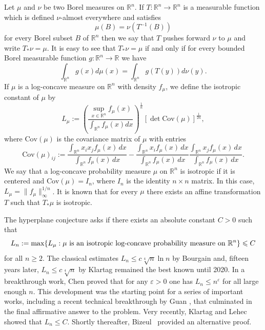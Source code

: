 \documentclass[11pt,leqno]{article}
\theoremstyle{definition}
\theoremstyle{remark}
\numberwithin{equation}{section}
\newcommand{\ls}{\leqslant}
\newcommand{\gr}{\geqslant}
\renewcommand{\epsilon}{\varepsilon}
\newcommand{\1}{\textbf{1}}
\begin{document}
Let $\mu $ and $\nu$ be two Borel measures on ${\mathbb R}^n$. If $T:{\mathbb
R}^n\to {\mathbb R}^n$ is a measurable function which is defined
$\nu $-almost everywhere and satisfies
\begin{equation*}\mu (B)=\nu (T^{-1}(B))\end{equation*}
for every Borel subset $B$ of ${\mathbb R}^n$ then we say that $T$
pushes forward $\nu $ to $\mu $ and write $T_*\nu=\mu$. It is
easy to see that $T_*\nu =\mu $ if and only if for every bounded Borel
measurable function $g:{\mathbb R}^n\to {\mathbb R}$ we have
\begin{equation*}\int_{{\mathbb R}^n}g(x)d\mu (x)=\int_{{\mathbb R}^n}g(T(y))d\nu (y).\end{equation*}
If $\mu $ is a log-concave measure on ${\mathbb R}^n$ with density $f_{\mu}$, we define the isotropic constant of $\mu $ by
\begin{equation*}
L_{\mu }:=\left (\frac{\sup_{x\in {\mathbb R}^n} f_{\mu} (x)}{\int_{{\mathbb
R}^n}f_{\mu}(x)dx}\right )^{\frac{1}{n}} [\det \textrm{Cov}(\mu)]^{\frac{1}{2n}},\end{equation*}
where $\textrm{Cov}(\mu)$ is the covariance matrix of $\mu$ with entries
\begin{equation*}\textrm{Cov}(\mu )_{ij}:=\frac{\int_{{\mathbb R}^n}x_ix_j f_{\mu}
(x)\,dx}{\int_{{\mathbb R}^n} f_{\mu} (x)\,dx}-\frac{\int_{{\mathbb
R}^n}x_i f_{\mu} (x)\,dx}{\int_{{\mathbb R}^n} f_{\mu}
(x)\,dx}\frac{\int_{{\mathbb R}^n}x_j f_{\mu}
(x)\,dx}{\int_{{\mathbb R}^n} f_{\mu} (x)\,dx}.\end{equation*} We say
that a log-concave probability measure $\mu $ on ${\mathbb R}^n$
is isotropic if it is centered and $\textrm{Cov}(\mu )=I_n$,
where $I_n$ is the identity $n\times n$ matrix. In this case, $L_{\mu }=\|f_{\mu }\|_{\infty }^{1/n}$.
It is known that for every $\mu $ there exists an affine transformation $T$
such that $T_{\ast }\mu $ is isotropic. 

The hyperplane conjecture asks if there exists an absolute constant $C>0$ such that
\begin{equation*}L_n:= \max\{ L_{\mu }:\mu\ \hbox{is an isotropic log-concave probability measure on}\ {\mathbb R}^n\}\ls C\end{equation*}
for all $n\gr 2$. The classical estimates $L_n\ls c\sqrt[4]{n}\ln n$ by Bourgain \cite{Bourgain-1991}
and, fifteen years later, $L_n\ls c\sqrt[4]{n}$ by Klartag \cite{Klartag-2006} remained the best known until
2020. In a breakthrough work, Chen \cite{Chen-2021} 
proved that for any $\epsilon >0$
one has $L_n\ls n^{\epsilon}$ for all large enough $n$. This development was the starting point for
a series of important works, including a recent technical breakthrough by Guan \cite{Guan}, that culminated
in the final affirmative answer to the problem. Very recently, Klartag and Lehec \cite{KL}
showed that $L_n\ls C$. Shortly thereafter, Bizeul~\cite{Bizeul-2025} provided an alternative proof.
\end{document}
